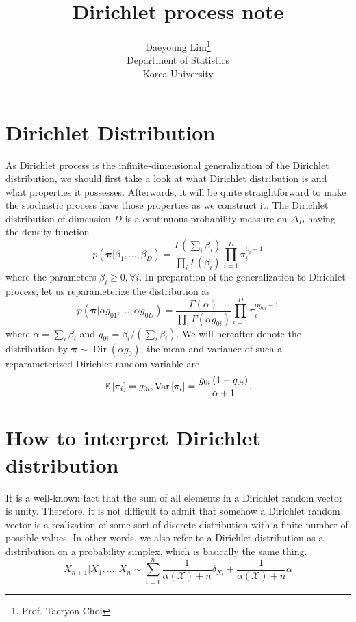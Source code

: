 \documentclass[11pt]{article}
\newcommand{\bs}{\boldsymbol}
\newcommand{\opn}{\operatorname}
\begin{document}
\nocite{*}
\title{Dirichlet process note}

\author{Daeyoung Lim\thanks{Prof. Taeryon Choi} \\
Department of Statistics \\
Korea University}

\maketitle
\section{Dirichlet Distribution}
  As Dirichlet process is the infinite-dimensional generalization of the Dirichlet distribution, we should first take a look at what Dirichlet distribution is and what properties it possesses. Afterwards, it will be quite straightforward to make the stochastic process have those properties as we construct it. The Dirichlet distribution of dimension $D$ is a continuous probability measure on $\Delta_{D}$ having the density function
  \begin{equation}
    p\left(\bs{\pi}|\beta_{1}, \ldots , \beta_{D}\right) = \frac{\Gamma\left(\sum_{i}\beta_{i}\right)}{\prod_{i}\Gamma\left(\beta_{i}\right)} \prod_{i=1}^{D}\pi_{i}^{\beta_{i}-1}
  \end{equation}
  where the parameters $\beta_{i} \geq 0, \forall i$. In preparation of the generalization to Dirichlet process, let us reparameterize the distribution as
  \begin{equation}
    p\left(\bs{\pi}|\alpha g_{01}, \ldots, \alpha g_{0D}\right) = \frac{\Gamma\left(\alpha\right)}{\prod_{i}\Gamma\left(\alpha g_{0i}\right)}\prod_{i=1}^{D}\pi_{i}^{\alpha g_{0i}-1}
  \end{equation}
  where $\alpha = \sum_{i} \beta_{i}$ and $g_{0i}=\beta_{i}/\left(\sum_{i}\beta_{i}\right)$. We will hereafter denote the distribution by $\bs{\pi} \sim \opn{Dir}\left(\alpha g_{0}\right)$; the mean and variance of such a reparameterized Dirichlet random variable are
  \begin{equation}
    \mathbb{E}\left[\pi_{i}\right]= g_{0i}, \hfill \opn{Var}\left[\pi_{i}\right] = \frac{g_{0i}\left(1-g_{0i}\right)}{\alpha+1}.
  \end{equation}
\section{How to interpret Dirichlet distribution}
It is a well-known fact that the sum of all elements in a Dirichlet random vector is unity. Therefore, it is not difficult to admit that somehow a Dirichlet random vector is a realization of some sort of discrete distribution with a finite number of possible values. In other words, we also refer to a Dirichlet distribution as a distribution on a probability simplex, which is basically the same thing. 
\begin{equation}
  X_{n+1}|X_{1},\ldots , X_{n} \sim \sum_{i=1}^{n}\frac{1}{\alpha\left(\mathcal{X}\right)+n}\delta_{X_{i}} + \frac{1}{\alpha\left(\mathcal{X}\right)+n}\alpha
\end{equation}
\end{document}
